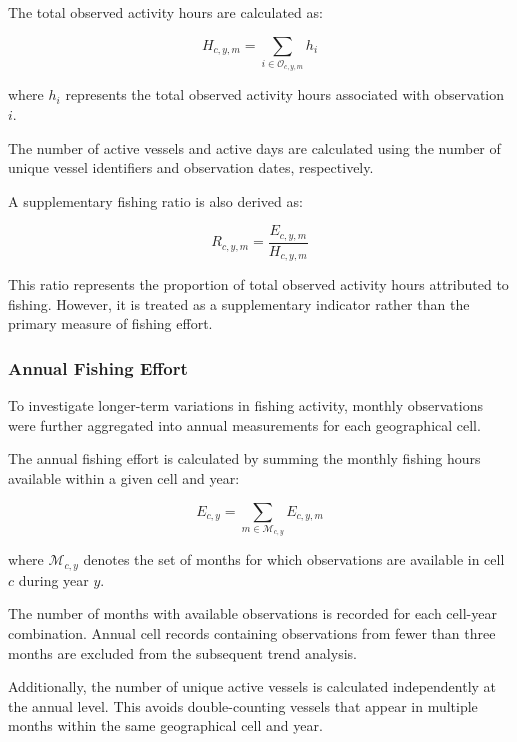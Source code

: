 \documentclass[pdflatex,sn-mathphys-num]{sn-jnl}
\theoremstyle{thmstyleone}
\theoremstyle{thmstyletwo}
\theoremstyle{thmstylethree}
\begin{document}
The total observed activity hours are calculated as:

\begin{equation}
H_{c,y,m} =
\sum_{i \in \mathcal{O}_{c,y,m}} h_i
\label{eq:total-hours}
\end{equation}

where $h_i$ represents the total observed activity
hours associated with observation $i$.

The number of active vessels and active days are
calculated using the number of unique vessel
identifiers and observation dates, respectively.

A supplementary fishing ratio is also derived as:

\begin{equation}
R_{c,y,m} =
\frac{E_{c,y,m}}{H_{c,y,m}}
\label{eq:fishing-ratio}
\end{equation}

This ratio represents the proportion of total
observed activity hours attributed to fishing.
However, it is treated as a supplementary
indicator rather than the primary measure
of fishing effort.


\subsubsection{Annual Fishing Effort}

To investigate longer-term variations in fishing
activity, monthly observations were further
aggregated into annual measurements for each
geographical cell.

The annual fishing effort is calculated by summing
the monthly fishing hours available within a given
cell and year:

\begin{equation}
E_{c,y} =
\sum_{m \in \mathcal{M}_{c,y}}
E_{c,y,m}
\label{eq:annual-effort}
\end{equation}

where $\mathcal{M}_{c,y}$ denotes the set of
months for which observations are available
in cell $c$ during year $y$.

The number of months with available observations
is recorded for each cell-year combination.
Annual cell records containing observations from
fewer than three months are excluded from the
subsequent trend analysis.

Additionally, the number of unique active vessels
is calculated independently at the annual level.
This avoids double-counting vessels that appear
in multiple months within the same geographical
cell and year.
\end{document}

